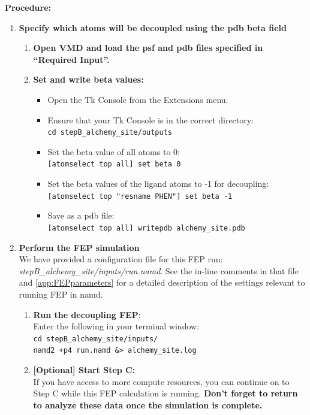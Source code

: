 \documentclass[9pt,tutorial]{Styling/livecoms}
\newcommand{\filepath}[1]{\textit{#1}}
\newcommand{\textInput}[1]{
  \texttt{#1}
}
\begin{document}
\noindent\textbf{Procedure:}
\begin{enumerate}
    \item \textbf{Specify which atoms will be decoupled using the pdb beta field}\label{step:makeFEPpdbSite} 
        \begin{enumerate}[label=\alph*., ref=\theenumi.\alph*]
            \item \textbf{Open VMD and load the psf and pdb files specified in ``Required Input''.}
            \item \textbf{Set and write beta values:}
            \begin{itemize}
                \item Open the Tk Console from the Extensions menu.
                \item Ensure that your Tk Console is in the correct directory:\\
                \textInput{cd stepB\_alchemy\_site/outputs}
                \item Set the beta value of all atoms to 0:\\
                \textInput{[atomselect top all] set beta 0}
                \item Set the beta values of the ligand atoms to -1 for decoupling:\\
                \textInput{[atomselect top "resname PHEN"] set beta -1}
                \item Save as a pdb file:\\
                \textInput{[atomselect top all] writepdb alchemy\_site.pdb}
            \end{itemize}
        \end{enumerate}

    \item \textbf{Perform the FEP simulation}\\
    We have provided a configuration file for this FEP run: \filepath{stepB\_alchemy\_site/inputs/run.namd}. See the in-line comments in that file and \ref{app:FEPparameters} for a detailed description of the settings relevant to running FEP in namd.
    \begin{enumerate}[label=\alph*., ref=\theenumi.\alph*]     
         \item \textbf{Run the decoupling FEP}:\\
         Enter the following in your terminal window:\\
            \textInput{cd stepB\_alchemy\_site/inputs/}\\
            \textInput{namd2 +p4 run.namd \&> alchemy\_site.log}
        \item \textbf{[Optional] Start Step C:}\\
        If you have access to more compute resources, you can continue on to Step C while this FEP calculation is running. \textbf{Don't forget to return to analyze these data once the simulation is complete.} 
    \end{enumerate}
    

\end{enumerate}
\end{document}
